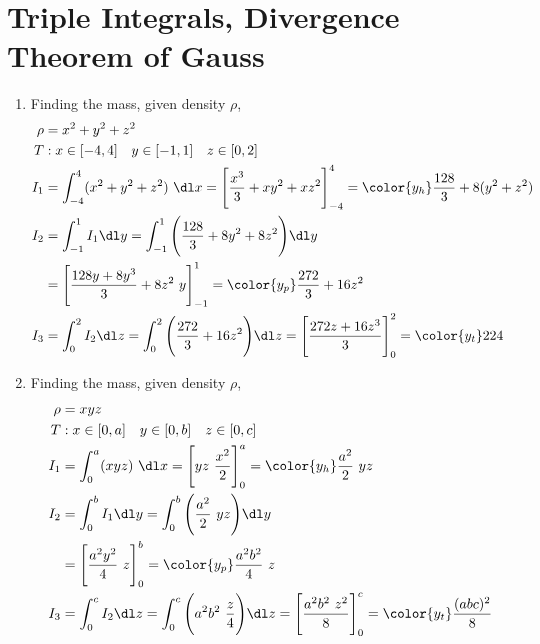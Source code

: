 \section{Triple Integrals, Divergence Theorem of Gauss}

\begin{enumerate}
    \item Finding the mass, given density $ \rho $,
          \begin{align}
              \rho & = x^2 + y^2 + z^2                                        \\
              T    & : x \in [-4, 4] \quad y \in [-1, 1] \quad z \in [0, 2]   \\
              I_1  & = \int_{-4}^{4} (x^2 + y^2 + z^2)\ \dl x
              = \Bigg[ \frac{x^3}{3} + xy^2 + xz^2 \Bigg]_{-4}^{4}
              = {\color{y_h} \frac{128}{3} + 8(y^2 + z^2)}                    \\
              I_2  & = \int_{-1}^{1}I_1 \dl y = \int_{-1}^{1}
              \Bigg(\frac{128}{3} + 8y^2 + 8z^2\Bigg) \dl y                   \\
                   & = \Bigg[ \frac{128y + 8y^3}{3} + 8z^2\ y \Bigg]_{-1}^{1}
              = {\color{y_p} \frac{272}{3} + 16z^2}                           \\
              I_3  & = \int_{0}^{2} I_2 \dl z = \int_{0}^{2}
              \Bigg( \frac{272}{3} + 16z^2 \Bigg) \dl z
              = \Bigg[ \frac{272 z + 16 z^3}{3} \Bigg]_0^2
              = {\color{y_t} 224}
          \end{align}

    \item Finding the mass, given density $ \rho $,
          \begin{align}
              \rho & = xyz                                                \\
              T    & : x \in [0, a] \quad y \in [0, b] \quad z \in [0, c] \\
              I_1  & = \int_{0}^{a} (xyz)\ \dl x
              = \Bigg[ yz\ \frac{x^2}{2} \Bigg]_{0}^{a}
              = {\color{y_h} \frac{a^2}{2}\ yz}                           \\
              I_2  & = \int_{0}^{b}I_1 \dl y = \int_{0}^{b}
              \Bigg( \frac{a^2}{2}\ yz \Bigg) \dl y                       \\
                   & = \Bigg[ \frac{a^2y^2}{4}\ z \Bigg]_{0}^{b}
              = {\color{y_p} \frac{a^2b^2}{4}\ z}                         \\
              I_3  & = \int_{0}^{c} I_2 \dl z = \int_{0}^{c}
              \Bigg( a^2 b^2\ \frac{z}{4} \Bigg) \dl z
              = \Bigg[ \frac{a^2b^2\ z^2}{8} \Bigg]_0^c
              = {\color{y_t} \frac{(abc)^2}{8}}
          \end{align}


\end{enumerate}
